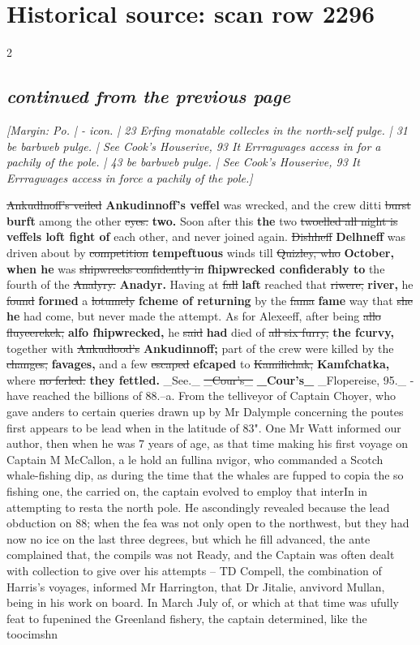 \documentclass[10pt]{article}
\begin{document}
\section*{Historical source: scan row 2296}
\begin{multicols}{2}
\subsection*{\textit{continued from the previous page}}
{\small\itshape [Margin: Po. | - icon. | 23 Erfing monatable collecles in the north-self pulge. | 31 be barbweb pulge. | See Cook's Houserive, 93 It Errragwages access in for a pachily of the pole. | 43 be barbweb pulge. | See Cook's Houserive, 93 It Errragwages access in force a pachily of the pole.]}\par
\sout{Ankudlnoff's veiled} \textbf{Ankudinnoff's veffel} was wrecked, and the crew ditti \sout{burst} \textbf{burft} among the other \sout{eyes.} \textbf{two.} Soon after this \textbf{the} two \sout{twoelled all night is} \textbf{veffels loft fight of} each other, and never joined again. \sout{Dishheff} \textbf{Delhneff} was driven about by \sout{competition} \textbf{tempeftuous} winds till \sout{Quizley, who} \textbf{October, when he} was \sout{shipwrecks confidently in} \textbf{fhipwrecked confiderably to} the fourth of the \sout{Analyry.} \textbf{Anadyr.} Having at \sout{fall} \textbf{laft} reached that \sout{riwere,} \textbf{river,} he \sout{found} \textbf{formed} a \sout{lotumely} \textbf{fcheme of returning} by the \sout{fama} \textbf{fame} way that \sout{she} \textbf{he} had come, but never made the attempt. As for Alexeeff, after being \sout{allo fluyeerekek,} \textbf{alfo fhipwrecked,} he \sout{said} \textbf{had} died of \sout{all six furry,} \textbf{the fcurvy,} together with \sout{Ankudlood’s} \textbf{Ankudinnoff;} part of the crew were killed by the \sout{changes,} \textbf{favages,} and a few \sout{escaped} \textbf{efcaped} to \sout{Kamilichak,} \textbf{Kamfchatka,} where \sout{no ferled.} \textbf{they fettled.} \_See.\_ \sout{\_Cour’s\_} \textbf{\_Cour's\_} \_Flopereise, 95.\_ - have reached the billions of 88.--a. From the telliveyor of Captain Choyer, who gave anders to certain queries drawn up by Mr Dalymple concerning the poutes first appears to be lead when in the latitude of 83". One Mr Watt informed our author, then when he was 7 years of age, as that time making his first voyage on Captain M McCallon, a le hold an fullina nvigor, who commanded a Scotch whale-fishing dip, as during the time that the whales are fupped to copia the so fishing one, the carried on, the captain evolved to employ that interIn in attempting to resta the north pole. He ascondingly revealed because the lead obduction on 88; when the fea was not only open to the northwest, but they had now no ice on the last three degrees, but which he fill advanced, the ante complained that, the compils was not Ready, and the Captain was often dealt with collection to give over his attempts – TD Compell, the combination of Harris’s voyages, informed Mr Harrington, that Dr Jitalie, anvivord Mullan, being in his work on board. In March July of, or which at that time was ufully feat to fupenined the Greenland fishery, the captain determined, like the toocimshn 
\end{multicols}
\end{document}
